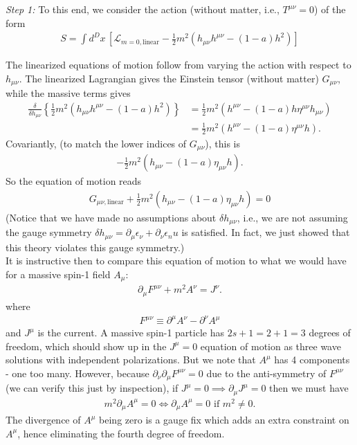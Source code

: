 \documentclass{book}
\theoremstyle{definition}
\newcommand{\p}{\partial}
\newcommand{\lag}{\mathcal{L}}
\newcommand{\nn}{\nonumber}
\newcommand{\f}[2]{\frac{#1}{#2}}
\newcommand{\lp}{\left(}
\newcommand{\rp}{\right)}
\newcommand{\lb}{\left[}
\newcommand{\rb}{\right]}
\newcommand{\lc}{\left\{}
\newcommand{\rc}{\right\}}
\begin{document}
\textit{Step 1:} To this end, we consider the action (without matter, i.e., $T^{\mu\nu} = 0$) of the form
\begin{align}
S = \int d^Dx\, \lb\lag_{m=0,\text{linear}} - \f{1}{2}m^2(h_{\mu\nu}h^{\mu\nu} - (1-a)h^2)\rb
\end{align}

The linearized equations of motion follow from varying the action with respect to $h_{\mu\nu}$. The linearized Lagrangian gives the Einstein tensor (without matter) $G_{\mu\nu}$, while the massive terms gives 
\begin{align}
\f{\delta}{\delta h_{\mu\nu}} \lc \f{1}{2}m^2\lp h_{\mu\nu}h^{\mu\nu} - (1-a)h^2 \rp \rc &=
\f{1}{2}m^2 \lp h^{\mu\nu} - (1-a) h \eta^{\mu\nu} h_{\mu\nu} \rp\nn\\
&= \f{1}{2}m^2 \lp h^{\mu\nu} - (1-a)\eta^{\mu\nu} h \rp.
\end{align}
Covariantly, (to match the lower indices of $G_{\mu\nu}$), this is 
\begin{align}
-\f{1}{2}m^2 \lp h_{\mu\nu} - (1-a)\eta_{\mu\nu} h \rp.
\end{align}
So the equation of motion reads
\begin{align}
\boxed{G_{\mu\nu, \text{linear}} + \f{1}{2}m^2 \lp h_{\mu\nu} - (1-a)\eta_{\mu\nu}h \rp = 0}
\end{align}
(Notice that we have made no assumptions about $\delta h_{\mu\nu}$, i.e., we are not assuming the gauge symmetry $\delta h_{\mu\nu} = \p_\mu \epsilon_\nu + \p_\nu \epsilon_nu$ is satisfied. In fact, we just showed that this theory violates this gauge symmetry.)\\

It is instructive then to compare this equation of motion to what we would have for a massive spin-1 field $A_\mu$:
\begin{align}
\p_\mu F^{\mu\nu} + m^2 A^\nu = J^\nu.
\end{align}
where
\begin{align}
F^{\mu\nu} \equiv \p^\mu A^\nu - \p^\nu A^\mu
\end{align}
and $J^\mu$ is the current. A massive spin-1 particle has $2s+1= 2+1 = 3$ degrees of freedom, which should show up in the $J^\mu = 0$ equation of motion as three wave solutions with independent polarizations. But we note that $A^\mu$ has 4 components - one too many. However, because $\p_\nu \p_\mu F^{\mu\nu} = 0$ due to the anti-symmetry of $F^{\mu\nu}$ (we can verify this just by inspection), if $J^\mu = 0 \implies \p_\mu J^\mu = 0$ then we must have
\begin{align}
m^2 \p_\mu A^\mu = 0 \iff \p_\mu A^\mu = 0 \text{ if } m^2\neq 0.
\end{align} 
The divergence of $A^\mu$ being zero is a gauge fix which adds an extra constraint on $A^\mu$, hence eliminating the fourth degree of freedom. \\
\end{document}
